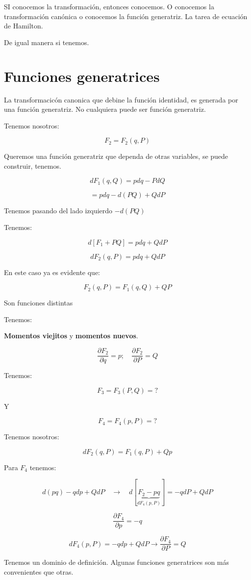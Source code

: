 \documentclass{article}
\begin{document}
SI conocemos la transformación, entonces conocemos. O conocemos la transformación canónica o conocemos la función generatriz. La tarea de ecuación de Hamilton. 


De igual manera si tenemos.

\section{Funciones generatrices}

La transformacicón canonica que debine la función identidad, es generada por una función generatriz. No cualquiera puede ser función generatriz.


Tenemos nosotros:


\[  F_{2} = F_{2}(q,P)  \]


Queremos una función generatriz que dependa de otras variables, se puede construir, tenemos.


\[ dF_{1}(q,Q) = pdq-PdQ \]


\[ = pdq -d(PQ) + QdP\]

Tenemos pasando del lado izquierdo $-d(PQ)$


Tenemos:


\[ d\left[ F_{1} + PQ  \right] = pdq +QdP \]

\[ dF_{2}(q,P) = pdq +QdP \]

En este caso ya es evidente que:


\[ F_{2}(q,P) = F_{1}(q,Q) + QP \]


Son funciones distintas 


Tenemos:


\textbf{Momentos viejitos} y \textbf{momentos nuevos}.


\[ \frac{\partial F_{2}}{\partial q} = p; \quad \frac{ \partial F_{2} }{\partial P}  = Q \]


Tenemos:



\[  F_{3} = F_{3}(P,Q) = ?\]


Y


\[ F_{4} = F_{4}(p,P) = ? \]


Tenemos nosotros: 

\[dF_{2}(q,P) = F_{1}(q,P)+Qp\]

Para $F_{4}$ tenemos:


\[d(pq)-qdp +QdP \quad \to \quad d[\underbrace{F_{2}-pq}_{dF_{4}(p,P)}] = -qdP+QdP  \]


\[ \frac{\partial F_{4}  }{ \partial p } = -q  \]

\[ dF_{4}(p,P) = -qdp+QdP \to \frac{\partial F_{4}}{\partial P} = Q \]


Tenemos un dominio de definición. Algunas funciones generatrices son más convenientes que otras. 
\end{document}

